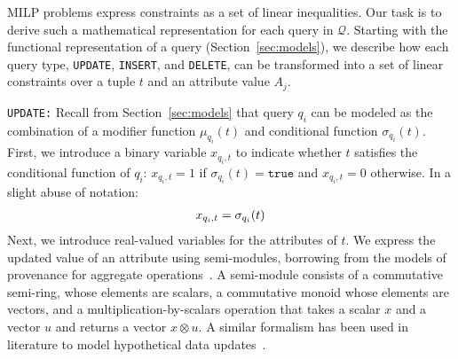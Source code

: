 
MILP problems express constraints as a set of linear inequalities. Our
task is to derive such a mathematical representation for each query in
$\mathcal{Q}$. Starting with the functional representation of a
query (Section~\ref{sec:models}), we describe how each query type,
\texttt{UPDATE}, \texttt{INSERT}, and \texttt{DELETE}, can be
transformed into a set of linear constraints over a tuple $t$ and an
attribute value $A_j$.



\smallskip
\noindent
\texttt{UPDATE:}
Recall from Section~\ref{sec:models} that query $q_i$ can be modeled
as the combination of a modifier function $\mu_{q_i}(t)$ and
conditional function $\sigma_{q_i}(t)$. First, we introduce a binary
variable $x_{q_i, t}$ to indicate whether $t$ satisfies the
conditional function of $q_i$: $x_{q_i, t}=1$ if
$\sigma_{q_i}(t)=\texttt{true}$ and $x_{q_i, t}=0$ otherwise. In a
slight abuse of notation:
% 
{\scriptsize
\begin{align}
\label{eq:x}
x_{q_i, t} = \sigma_{q_i}(t)
\vspace*{-0.1in}
\end{align}
}
Next, we introduce real-valued variables for the attributes of $t$.
We express the updated value
of an attribute using semi-modules, borrowing from the models of
provenance for aggregate operations~\cite{Amsterdamer2011}. A
semi-module consists of a commutative semi-ring, whose elements are
scalars, a commutative monoid whose elements are vectors, and a
multiplication-by-scalars operation that takes a scalar $x$ and a
vector $u$ and returns a vector $x \otimes u$. A similar formalism has
been used in literature to model hypothetical data
updates~\cite{tiresias}.

